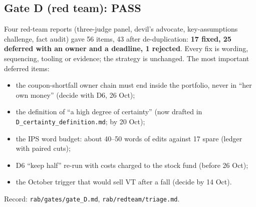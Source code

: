 \subsection*{Gate D (red team): PASS}
Four red-team reports (three-judge panel, devil's advocate, key-assumptions challenge, fact audit) gave 56 items,
43 after de-duplication: \textbf{17 fixed, 25 deferred with an owner and a deadline, 1 rejected}. Every fix is
wording, sequencing, tooling or evidence; the strategy is unchanged. The most important deferred items:
\begin{itemize}
  \item the coupon-shortfall owner chain must end inside the portfolio, never in ``her own money'' (decide with D6, 26 Oct);
  \item the definition of ``a high degree of certainty'' (now drafted in \texttt{D\_certainty\_definition.md}; by 20 Oct);
  \item the IPS word budget: about 40--50 words of edits against 17 spare (ledger with paired cuts);
  \item D6 ``keep half'' re-run with costs charged to the stock fund (before 26 Oct);
  \item the October trigger that would sell VT after a fall (decide by 14 Oct).
\end{itemize}
Record: \texttt{rab/gates/gate\_D.md}, \texttt{rab/redteam/triage.md}.
\normalsize
